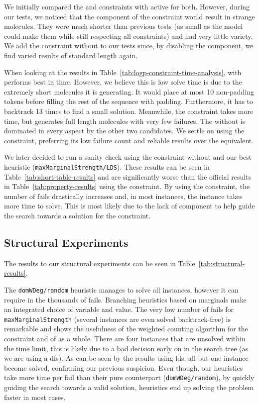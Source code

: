 \documentclass[../Document.tex]{subfiles}
\begin{document}
We initially compared the \shortTable and \regular constraints with \bp active for both. However, during our tests, we noticed that the \bp component of the \shortTable constraint would result in strange molecules. They were much shorter than previous tests (as small as the model could make them while still respecting all constraints) and had very little variety. We add the \shortTable constraint without \bp to our tests since, by disabling the \bp component, we find varied results of standard length again.

When looking at the results in Table~\ref{tab:logp-constraint-time-analysis}, \shortTable with \bp performs best in time.
However, we believe this is low solve time is due to the extremely short molecules it is generating. It would place at most 10 non-padding tokens before filling the rest of the sequence with padding.
Furthermore, it has to backtrack 13 times to find a small solution.
Meanwhile, the \regular constraint takes more time, but generates full length molecules with very few failures.
The \shortTable without \bp is dominated in every aspect by the other two candidates.
We settle on using the \regular constraint, preferring its low failure count and reliable results over the \shortTable equivalent.

We later decided to run a sanity check using the \shortTable constraint without \bp and our best heuristic (\ie \texttt{maxMarginalStrength/LDS}).
These results can be seen in Table~\ref{tab:short-table-results} and are significantly worse than the official results in Table~\ref{tab:property-results} using the \regular constraint.
By using the \shortTable constraint, the number of fails drastically increases and, in most instances, the instance takes more time to solve.
This is most likely due to the lack of \bp component to help guide the search towards a solution for the \shortTable constraint.


\subsection{Structural Experiments}
The results to our structural experiments can be seen in Table~\ref{tab:structural-results}.

The \texttt{domWDeg/random} heuristic manages to solve all instances, however it can require in the thousands of fails.
Branching heuristics based on marginals make an integrated choice of variable and value.
The very low number of fails for \texttt{maxMarginalStrength} (several instances are even solved backtrack-free) is remarkable and shows the usefulness of the weighted counting algorithm for the \grammar constraint and of \bp as a whole.
There are four instances that are unsolved within the time limit, this is likely due to a bad decision early on in the search tree (as we are using a \gls{dfs}).
As can be seen by the results using \gls{lds}, all but one instance become solved, confirming our previous suspicion.
Even though, our \bp heuristics take more time per fail than their pure \cp counterpart (\ie \texttt{domWDeg/random}), by quickly guiding the search towards a valid solution, \bp heuristics end up solving the problem faster in most cases.
\end{document}
